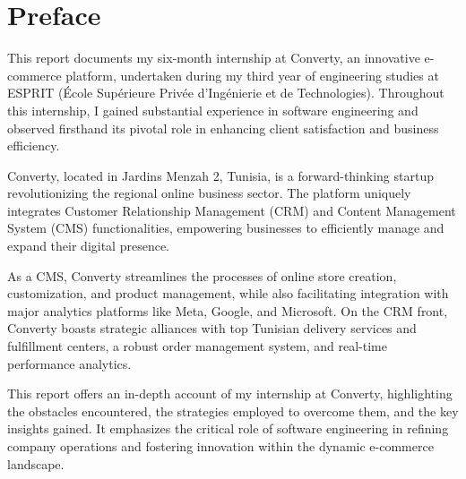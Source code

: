 \chapter*{Preface}

This report documents my six-month internship at Converty, an innovative e-commerce platform, undertaken during my third year of engineering studies at ESPRIT (École Supérieure Privée d'Ingénierie et de Technologies). Throughout this internship, I gained substantial experience in software engineering and observed firsthand its pivotal role in enhancing client satisfaction and business efficiency.
\newline

Converty, located in Jardins Menzah 2, Tunisia, is a forward-thinking startup revolutionizing the regional online business sector. The platform uniquely integrates Customer Relationship Management (CRM) and Content Management System (CMS) functionalities, empowering businesses to efficiently manage and expand their digital presence.
\newline

As a CMS, Converty streamlines the processes of online store creation, customization, and product management, while also facilitating integration with major analytics platforms like Meta, Google, and Microsoft. On the CRM front, Converty boasts strategic alliances with top Tunisian delivery services and fulfillment centers, a robust order management system, and real-time performance analytics.
\newline

This report offers an in-depth account of my internship at Converty, highlighting the obstacles encountered, the strategies employed to overcome them, and the key insights gained. It emphasizes the critical role of software engineering in refining company operations and fostering innovation within the dynamic e-commerce landscape.